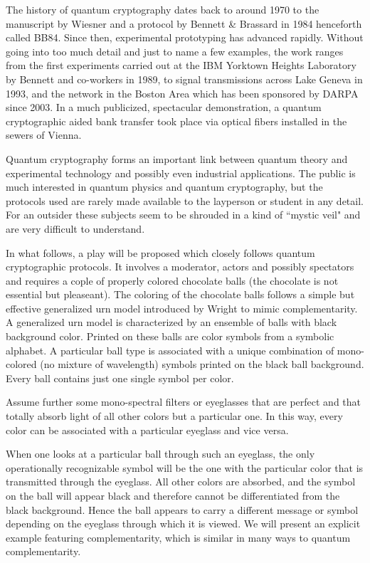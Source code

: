 \documentclass[prb,amssymb,preprint]{revtex4}
\begin{document}
The history of quantum cryptography dates back to around 1970 to the
manuscript by Wiesner\cite{wiesner} and a protocol
by Bennett \& Brassard\cite{benn-82,benn-84,ekert91,benn-92,gisin-qc-rmp}
in 1984 henceforth called BB84. Since
then, experimental prototyping has advanced rapidly.
Without going into too
much detail and just to name a few examples, the work ranges from the
first experiments carried out at the IBM Yorktown Heights Laboratory
by Bennett and co-workers in
1989,\cite{benn-92}
to signal transmissions across Lake Geneva in 1993,\cite{gisin-qc-rmp} and
the network in the Boston Area which has been sponsored by DARPA since
2003.\cite{ell-co-05} In a much publicized, spectacular demonstration, a
quantum cryptographic aided bank transfer took place via optical fibers
installed in the sewers of Vienna.\cite{pflmubpskwjz}

Quantum cryptography forms an important link between quantum theory and
experimental technology and possibly even industrial applications. The
public is much interested in quantum physics and quantum cryptography, but
the protocols used are rarely made available to the layperson or student in
any detail. For an outsider these subjects seem to be shrouded in a kind
of ``mystic veil" and are very difficult to understand.


In what follows,
a play will be proposed which closely follows quantum cryptographic protocols.
It involves a moderator, actors and possibly spectators
and requires a cople of properly colored chocolate balls
(the chocolate is not essential but pleaseant).
The coloring of the chocolate balls follows
a simple but effective generalized urn
model introduced by Wright\cite{wright,wright:pent,svozil-2001-eua} to mimic
complementarity. A generalized urn model is
characterized by an ensemble of balls with black background color.
Printed on these balls are color symbols from a symbolic alphabet.
A particular ball type is associated with a unique combination of
mono-colored (no mixture of wavelength) symbols printed on the black ball
background. Every ball contains just one single symbol per color.

Assume further some mono-spectral filters or eyeglasses that are
perfect and that totally absorb light of all other colors
but a particular one.
In this way, every color can be associated with a particular eyeglass and
vice versa.

When one
looks
at a particular ball through such an eyeglass, the only operationally
recognizable symbol will be the one with the particular color that is
transmitted through the eyeglass. All other colors are absorbed, and the
symbol on the ball will appear black and therefore cannot be
differentiated from the black background. Hence the ball appears to carry a
different message or symbol depending on the eyeglass through which it is
viewed. We will present an explicit example featuring complementarity, which
is similar in many ways to quantum complementarity.
\end{document}
